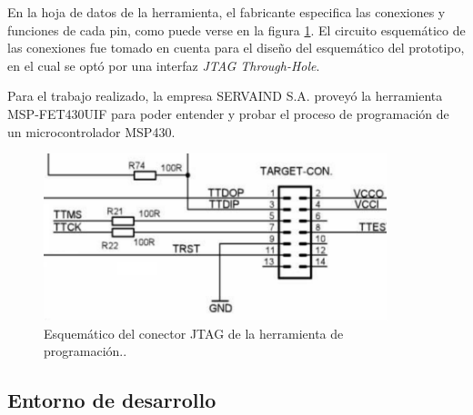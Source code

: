 

En la hoja de datos de la herramienta, el fabricante especifica las conexiones y funciones de cada pin, como puede verse en la figura \ref{fig:JtagSCH}. El circuito esquemático de las conexiones fue tomado en cuenta para el diseño del esquemático del prototipo, en el cual se optó por una interfaz \textit{JTAG Through-Hole}. 

Para el trabajo realizado, la empresa SERVAIND S.A. proveyó la herramienta MSP-FET430UIF para poder entender y probar el proceso de programación de un microcontrolador MSP430.


\begin{figure}[!h]
	\centering
	\includegraphics[width=100mm,keepaspectratio]{Figures/Jtagfetsch.png}
	\caption{ Esquemático del conector JTAG de la herramienta de programación.. }
	\label{fig:JtagSCH}
\end{figure}



\subsection{Entorno de desarrollo}
